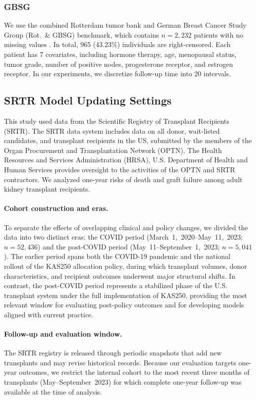 \documentclass{article}
\theoremstyle{plain}
\theoremstyle{definition}
\theoremstyle{remark}
\begin{document}
\subsubsection{GBSG}
We use the combined Rotterdam tumor bank and German Breast Cancer Study Group (Rot.\ \& GBSG) benchmark, which contains $n=2{,}232$ patients with no missing values \citep{foekens2000urokinase, schumacher1994randomized}.
In total, 965 (43.23\%) individuals are right-censored.
Each patient has 7 covariates, including hormone therapy, age, menopausal status, tumor grade, number of positive nodes, progesterone receptor, and estrogen receptor.
In our experiments, we discretize follow-up time into 20 intervals.




\subsection{SRTR Model Updating Settings}
\label{A.SRTRSettings}
This study used data from the Scientific Registry of Transplant Recipients (SRTR). The SRTR data system includes data on all donor, wait-listed candidates, and transplant recipients in the US, submitted by the members of the Organ Procurement and Transplantation Network (OPTN). The Health Resources and Services Administration (HRSA), U.S. Department of Health and Human Services provides oversight to the activities of the OPTN and SRTR contractors. We analyzed one-year risks of death and graft failure among adult kidney transplant recipients.

\paragraph{Cohort construction and eras.}
To separate the effects of overlapping clinical and policy changes, we divided the data into two distinct eras: the COVID period (March~1,~2020–May~11,~2023; $n=52{,}436$) and the post-COVID period (May~11–September~1,~2023; $n=5{,}041$).
The earlier period spans both the COVID-19 pandemic and the national rollout of the KAS250 allocation policy, during which transplant volumes, donor characteristics, and recipient outcomes underwent major structural shifts.
In contrast, the post-COVID period represents a stabilized phase of the U.S. transplant system under the full implementation of KAS250, providing the most relevant window for evaluating post-policy outcomes and for developing models aligned with current practice.

\paragraph{Follow-up and evaluation window.}
The SRTR registry is released through periodic snapshots that add new transplants and may revise historical records.
Because our evaluation targets one-year outcomes, we restrict the internal cohort to the most recent three months of transplants (May--September~2023) for which complete one-year follow-up was available at the time of analysis.
\end{document}
